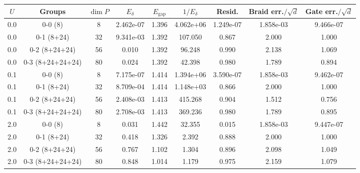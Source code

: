 \begin{tabular}{ccccccccc}
\hline
$U$ & Groups & $\dim P$ & $E_\delta$ & $E_{\mathrm{gap}}$ & $1/E_\delta$ & Resid. & Braid err.$/\sqrt{d}$ & Gate err.$/\sqrt{d}$ \\
\hline
0.0 & 0-0 (8) & 8 & 2.462e-07 & 1.396 & 4.062e+06 & 1.249e-07 & 1.858e-03 & 9.466e-07 \\
0.0 & 0-1 (8+24) & 32 & 9.341e-03 & 1.392 & 107.050 & 0.867 & 2.000 & 1.000 \\
0.0 & 0-2 (8+24+24) & 56 & 0.010 & 1.392 & 96.248 & 0.990 & 2.138 & 1.069 \\
0.0 & 0-3 (8+24+24+24) & 80 & 0.024 & 1.392 & 42.398 & 0.980 & 1.789 & 0.894 \\
0.1 & 0-0 (8) & 8 & 7.175e-07 & 1.414 & 1.394e+06 & 3.590e-07 & 1.858e-03 & 9.462e-07 \\
0.1 & 0-1 (8+24) & 32 & 8.709e-04 & 1.414 & 1.148e+03 & 0.866 & 2.000 & 1.000 \\
0.1 & 0-2 (8+24+24) & 56 & 2.408e-03 & 1.413 & 415.268 & 0.904 & 1.512 & 0.756 \\
0.1 & 0-3 (8+24+24+24) & 80 & 2.708e-03 & 1.413 & 369.236 & 0.980 & 1.789 & 0.895 \\
2.0 & 0-0 (8) & 8 & 0.031 & 1.442 & 32.355 & 0.015 & 1.858e-03 & 9.447e-07 \\
2.0 & 0-1 (8+24) & 32 & 0.418 & 1.326 & 2.392 & 0.888 & 2.000 & 1.000 \\
2.0 & 0-2 (8+24+24) & 56 & 0.767 & 1.102 & 1.304 & 0.896 & 2.098 & 1.049 \\
2.0 & 0-3 (8+24+24+24) & 80 & 0.848 & 1.014 & 1.179 & 0.975 & 2.159 & 1.079 \\
\hline
\end{tabular}
